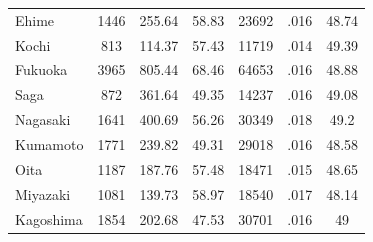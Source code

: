 \begin{tabular}{l*{6}{c}}
Ehime       &        1446&      255.64&       58.83&       23692&        .016&       48.74\\
Kochi       &         813&      114.37&       57.43&       11719&        .014&       49.39\\
Fukuoka     &        3965&      805.44&       68.46&       64653&        .016&       48.88\\
Saga        &         872&      361.64&       49.35&       14237&        .016&       49.08\\
Nagasaki    &        1641&      400.69&       56.26&       30349&        .018&        49.2\\
Kumamoto    &        1771&      239.82&       49.31&       29018&        .016&       48.58\\
Oita        &        1187&      187.76&       57.48&       18471&        .015&       48.65\\
Miyazaki    &        1081&      139.73&       58.97&       18540&        .017&       48.14\\
Kagoshima   &        1854&      202.68&       47.53&       30701&        .016&          49\\
\hline\hline
\end{tabular}
